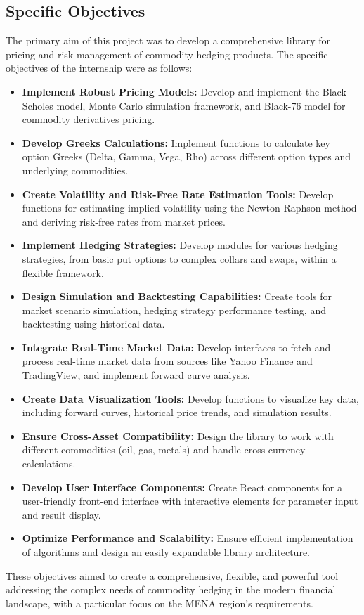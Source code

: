 \documentclass[12pt]{article}
\begin{document}
\subsection{Specific Objectives}
The primary aim of this project was to develop a comprehensive library for pricing and risk management of commodity hedging products. The specific objectives of the internship were as follows:
\begin{itemize}
\item \textbf{Implement Robust Pricing Models:}
Develop and implement the Black-Scholes model, Monte Carlo simulation framework, and Black-76 model for commodity derivatives pricing.
\item \textbf{Develop Greeks Calculations:} 
Implement functions to calculate key option Greeks (Delta, Gamma, Vega, Rho) across different option types and underlying commodities.

\item \textbf{Create Volatility and Risk-Free Rate Estimation Tools:} 
Develop functions for estimating implied volatility using the Newton-Raphson method and deriving risk-free rates from market prices.

\item \textbf{Implement Hedging Strategies:} 
Develop modules for various hedging strategies, from basic put options to complex collars and swaps, within a flexible framework.

\item \textbf{Design Simulation and Backtesting Capabilities:} 
Create tools for market scenario simulation, hedging strategy performance testing, and backtesting using historical data.

\item \textbf{Integrate Real-Time Market Data:} 
Develop interfaces to fetch and process real-time market data from sources like Yahoo Finance and TradingView, and implement forward curve analysis.

\item \textbf{Create Data Visualization Tools:} 
Develop functions to visualize key data, including forward curves, historical price trends, and simulation results.

\item \textbf{Ensure Cross-Asset Compatibility:} 
Design the library to work with different commodities (oil, gas, metals) and handle cross-currency calculations.

\item \textbf{Develop User Interface Components:} 
Create React components for a user-friendly front-end interface with interactive elements for parameter input and result display.

\item \textbf{Optimize Performance and Scalability:} 
Ensure efficient implementation of algorithms and design an easily expandable library architecture.
\end{itemize}
These objectives aimed to create a comprehensive, flexible, and powerful tool addressing the complex needs of commodity hedging in the modern financial landscape, with a particular focus on the MENA region's requirements.
\end{document}
